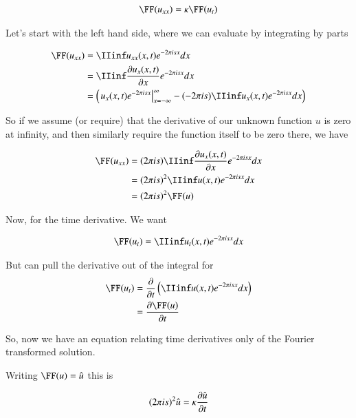 \begin{align*}
\FF(u_{xx}) = \kappa \FF(u_t)
\end{align*}

Let's start with the left hand side, where we can evaluate by integrating by parts

\begin{align*}
\FF(u_{xx}) 
&= 
\IIinf u_{xx}(x, t) e^{- 2 \pi i s x } dx \\
&= 
\IIinf \PD{x}{u_x(x, t)} e^{- 2 \pi i s x } dx \\
&= 
\left(
{\left. u_x(x, t) e^{- 2 \pi i s x } \right\vert}_{x= -\infty}^\infty
-( - 2 \pi i s ) \IIinf u_x(x, t) e^{- 2 \pi i s x } dx 
\right) \\
\end{align*}

So if we assume (or require) that the derivative of our unknown function $u$ is zero at infinity, and then similarly
require the function itself to be zero there, we have

\begin{align*}
\FF(u_{xx}) 
&= 
( 2 \pi i s ) \IIinf \PD{x}{u_x(x, t)} e^{- 2 \pi i s x } dx  \\
&= 
( 2 \pi i s )^2 \IIinf u(x, t) e^{- 2 \pi i s x } dx  \\
&= ( 2 \pi i s )^2 \FF(u)
\end{align*}

Now, for the time derivative.  We want

\begin{align*}
\FF(u_t) &= 
\IIinf u_t(x, t) e^{- 2 \pi i s x } dx \\
\end{align*}

But can pull the derivative out of the integral for
\begin{align*}
\FF(u_t)
&= \PD{t}{} \left(
\IIinf u(x, t) e^{- 2 \pi i s x } dx \right) \\
&= \PD{t}{\FF(u)} 
\end{align*}

So, now we have an equation relating time derivatives only of the Fourier transformed solution.

Writing $\FF(u) = \hat{u}$ this is

\begin{align}\label{eqn:heat_fourier:toSolveFreq}
( 2 \pi i s )^2 \hat{u} = \kappa \PD{t}{\hat{u}}
\end{align}

